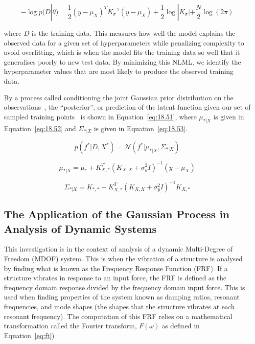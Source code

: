 \documentclass[12pt]{article}
\begin{document}
    \begin{equation}
        -\log p(D|\theta) = \frac{1}{2} (y - \mu_X)^T K_{\sigma}^{-1} (y - \mu_X) + \frac{1}{2} \log |K_{\sigma}| + \frac{N}{2} \log(2\pi)\label{eq:NLML}
    \end{equation}


    where $D$ is the training data.
    This measures how well the model explains the observed data for a given set of hyperparameters while penalizing complexity to avoid overfitting, which is when the model fits the training data so well that it generalises poorly to new test data.
    By minimizing this NLML, we identify the hyperparameter values that are most likely to produce the observed training data.

    By a process called conditioning the joint Gaussian prior distribution on the observations~\cite{rasmussen2006gaussian}, the ``posterior'', or prediction of the latent function given our set of sampled training points~\cite{murphy2023probabilistic} is shown in Equation~\ref{eq:18.51}, where $\mu_{*|X}$ is given in Equation~\ref{eq:18.52} and $\Sigma_{*|X}$ is given in Equation~\ref{eq:18.53}.

    \begin{equation}
        p(f^* | D, X^*) = \mathcal{N}(f^* | \mu_{*|X}, \Sigma_{*|X})\label{eq:18.51}
    \end{equation}

    \begin{equation}
        \mu_{*|X} = \mu_* + K_{X,*}^T (K_{X,X} + \sigma^2_y I)^{-1} (y - \mu_X)\label{eq:18.52}
    \end{equation}

    \begin{equation}
        \Sigma_{*|X} = K_{*,*} - K_{X,*}^T (K_{X,X} + \sigma^2_y I)^{-1} K_{X,*}\label{eq:18.53}
    \end{equation}

    \subsection{The Application of the Gaussian Process in Analysis of Dynamic Systems}

    This investigation is in the context of analysis of a dynamic Multi-Degree of Freedom (MDOF) system.
    This is when the vibration of a structure is analysed by finding what is known as the Frequency Response Function (FRF). If a structure vibrates in response to an input force, the FRF is defined as the frequency domain response divided by the frequency domain input force.
    This is used when finding properties of the system known as damping ratios, resonant frequencies, and mode shapes (the shapes that the structure vibrates at each resonant frequency).
    The computation of this FRF relies on a mathematical transformation called the Fourier transform, $F(\omega)$ as defined in Equation~\ref{eq:ft})
\end{document}
